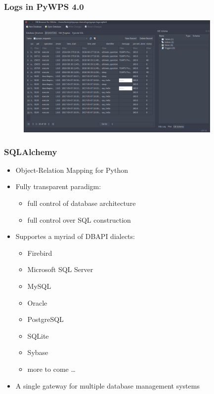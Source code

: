 \documentclass{beamer}
\begin{document}
\begin{frame}
\frametitle<presentation>{Logs in PyWPS 4.0}

  \begin{figure}[ht]
   \centering
   \includegraphics[height=6cm]{figures/SQLiteBrowser}
  \end{figure}

\end{frame}


\begin{frame}
\frametitle<presentation>{SQLAlchemy}


\begin{itemize}
  \item Object-Relation Mapping for Python
  \item Fully transparent paradigm:
  \begin{itemize} 
    \item full control of database architecture 
    \item full control over SQL construction
  \end{itemize}
  \item Supportes a myriad of DBAPI dialects:
  \begin{itemize}
    \item Firebird
    \item Microsoft SQL Server
    \item MySQL
    \item Oracle
    \item PostgreSQL
    \item SQLite
    \item Sybase
    \item more to come \ldots
  \end{itemize}
  \item A single gateway for multiple database management systems
\end{itemize}

\end{frame}
\end{document}
